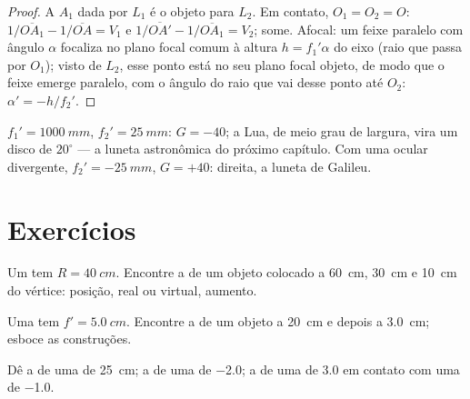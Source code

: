 \begin{proof}
A  $A_1$ dada por $L_1$ é o objeto para $L_2$. Em contato,
$O_1 = O_2 = O$: $1/\overline{OA_1} - 1/\overline{OA} = V_1$ e
$1/\overline{OA'} - 1/\overline{OA_1} = V_2$; some. Afocal: um feixe
paralelo com ângulo $\alpha$ focaliza no plano focal comum à altura
$h = f_1'\alpha$ do eixo (raio que passa por $O_1$); visto de $L_2$, esse
ponto está no seu plano focal objeto, de modo que o feixe emerge paralelo, com o
ângulo do raio que vai desse ponto até $O_2$: $\alpha' = -h/f_2'$.
\end{proof}

\begin{example}\label{ex:b1:mirrors-thin-lenses:afocal}
$f_1' = \qty{1000}{mm}$, $f_2' = \qty{25}{mm}$: $G = -40$; a Lua,
de meio grau de largura, vira um disco de $20^\circ$ --- a luneta
astronômica do próximo capítulo. Com uma ocular divergente,
$f_2' = \qty{-25}{mm}$, $G = +40$: direita, a luneta de Galileu.
\end{example}

\section{Exercícios}

\begin{exercise}[$\star$]\label{exo:b1:mirrors-thin-lenses:1}
Um  tem $R = \qty{40}{cm}$. Encontre a  de um objeto
colocado a \qty{60}{cm}, \qty{30}{cm} e \qty{10}{cm} do vértice:
posição, real ou virtual, aumento.
\end{exercise}

\begin{exercise}[$\star$]\label{exo:b1:mirrors-thin-lenses:2}
Uma  tem $f' = \qty{5.0}{cm}$. Encontre a  de um objeto
a \qty{20}{cm} e depois a \qty{3.0}{cm}; esboce as construções.
\end{exercise}

\begin{exercise}[$\star$]\label{exo:b1:mirrors-thin-lenses:3}
Dê a  de uma  de  \qty{25}{cm}; a  de uma  de \qty{-2.0}{\delta}; a  de uma  de
\qty{+3.0}{\delta} em contato com uma de \qty{-1.0}{\delta}.
\end{exercise}

